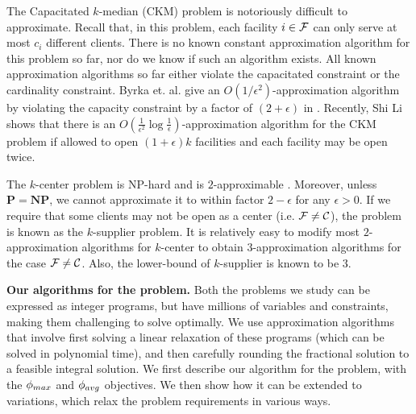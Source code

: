 The Capacitated $k$-median (CKM) problem is notoriously difficult to approximate. Recall that, in this problem, each facility $i \in \mathcal{F}$ can only serve at most $c_i$ different clients. There is no known constant approximation algorithm for this problem so far, nor do we know if such an algorithm exists. All known approximation algorithms so far either violate the capacitated constraint or the cardinality constraint. Byrka et. al. give an $O(1/\epsilon^2)$-approximation algorithm by violating the capacity constraint by a factor of $(2+\epsilon)$ in \cite{byrka_ckm}. Recently, Shi Li \cite{li_ckm} shows that there is an $O\left(\frac{1}{\epsilon^2} \log \frac{1}{\epsilon} \right) $-approximation algorithm for the CKM problem if allowed to open $(1+\epsilon)k$ facilities and each facility may be open twice.

The $k$-center problem is NP-hard and is $2$-approximable \cite{book:ws}. Moreover, unless $\mathbf{P} = \mathbf{NP}$, we cannot approximate it to within factor $2-\epsilon$ for any $\epsilon>0$. If we require that some clients may not be open as a center (i.e. $\mathcal{F} \neq \mathcal{C}$), the problem is known as the $k$-supplier problem. It is relatively easy to modify most $2$-approximation algorithms for $k$-center to obtain $3$-approximation algorithms for the case $\mathcal{F} \neq \mathcal{C}$. Also, the lower-bound of $k$-supplier is known to be $3$.

\noindent
\textbf{Our algorithms for the \probstatic{} problem.}
Both the problems we study can be expressed as integer programs, but have millions of variables and
constraints, making them challenging to solve optimally.
We use approximation algorithms that involve first solving a linear relaxation of these programs
(which can be solved in polynomial time), and then carefully rounding the fractional solution 
to a feasible integral solution. We first describe our algorithm for the \probstatic{} problem,
with the $\phi_{max}$ and $\phi_{avg}$ objectives. We then show how it can be extended to variations,
which relax the problem requirements in various ways.

